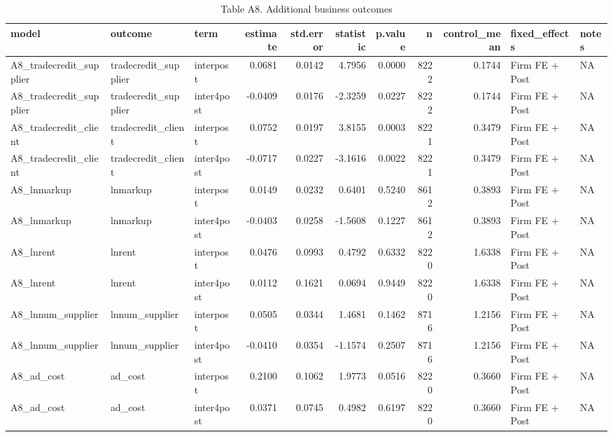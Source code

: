 \begin{table}

\caption{Table A8. Additional business outcomes}
\centering
\begin{tabular}[t]{lllrrrrrrll}
\toprule
model & outcome & term & estimate & std.error & statistic & p.value & n & control\_mean & fixed\_effects & notes\\
\midrule
A8\_tradecredit\_supplier & tradecredit\_supplier & interpost & 0.0681 & 0.0142 & 4.7956 & 0.0000 & 8222 & 0.1744 & Firm FE + Post & NA\\
A8\_tradecredit\_supplier & tradecredit\_supplier & inter4post & -0.0409 & 0.0176 & -2.3259 & 0.0227 & 8222 & 0.1744 & Firm FE + Post & NA\\
A8\_tradecredit\_client & tradecredit\_client & interpost & 0.0752 & 0.0197 & 3.8155 & 0.0003 & 8221 & 0.3479 & Firm FE + Post & NA\\
A8\_tradecredit\_client & tradecredit\_client & inter4post & -0.0717 & 0.0227 & -3.1616 & 0.0022 & 8221 & 0.3479 & Firm FE + Post & NA\\
A8\_lnmarkup & lnmarkup & interpost & 0.0149 & 0.0232 & 0.6401 & 0.5240 & 8612 & 0.3893 & Firm FE + Post & NA\\
\addlinespace
A8\_lnmarkup & lnmarkup & inter4post & -0.0403 & 0.0258 & -1.5608 & 0.1227 & 8612 & 0.3893 & Firm FE + Post & NA\\
A8\_lnrent & lnrent & interpost & 0.0476 & 0.0993 & 0.4792 & 0.6332 & 8220 & 1.6338 & Firm FE + Post & NA\\
A8\_lnrent & lnrent & inter4post & 0.0112 & 0.1621 & 0.0694 & 0.9449 & 8220 & 1.6338 & Firm FE + Post & NA\\
A8\_lnnum\_supplier & lnnum\_supplier & interpost & 0.0505 & 0.0344 & 1.4681 & 0.1462 & 8716 & 1.2156 & Firm FE + Post & NA\\
A8\_lnnum\_supplier & lnnum\_supplier & inter4post & -0.0410 & 0.0354 & -1.1574 & 0.2507 & 8716 & 1.2156 & Firm FE + Post & NA\\
\addlinespace
A8\_ad\_cost & ad\_cost & interpost & 0.2100 & 0.1062 & 1.9773 & 0.0516 & 8220 & 0.3660 & Firm FE + Post & NA\\
A8\_ad\_cost & ad\_cost & inter4post & 0.0371 & 0.0745 & 0.4982 & 0.6197 & 8220 & 0.3660 & Firm FE + Post & NA\\
\bottomrule
\end{tabular}
\end{table}
